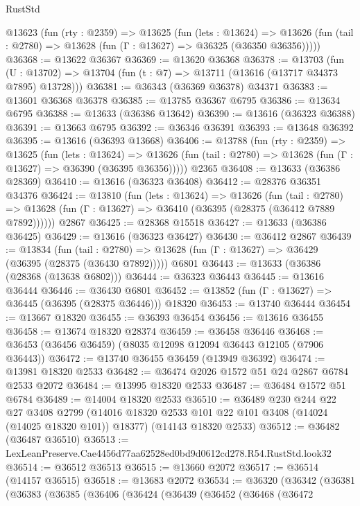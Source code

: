 \begin{lexlean}{RustStd}
\begin{coremodule}
  @13623
    (fun (rty : @2359) =>
    @13625
      (fun (lets : @13624) =>
      @13626 (fun (tail : @2780) => @13628 (fun (Γ : @13627) => @36325 (@36350 @36356)))))
@36368 := @13622 @36367
@36369 := @13620 @36368
@36378 := @13703
    (fun (U : @13702) => @13704 (fun (t : @7) => @13711 (@13616 (@13717 @34373 @7895) @13728)))
@36381 := @36343 (@36369 @36378) @34371
@36383 := @13601 @36368 @36378
@36385 := @13785 @36367 @6795
@36386 := @13634 @6795
@36388 := @13633 (@36386 @13642)
@36390 := @13616 (@36323 @36388)
@36391 := @13663 @6795
@36392 := @36346 @36391
@36393 := @13648 @36392
@36395 := @13616 (@36393 @13668)
@36406 := @13788
    (fun (rty : @2359) =>
    @13625
      (fun (lets : @13624) =>
      @13626 (fun (tail : @2780) => @13628 (fun (Γ : @13627) => @36390 (@36395 @36356)))))
    @2365
@36408 := @13633 (@36386 @28369)
@36410 := @13616 (@36323 @36408)
@36412 := @28376 @36351 @34376
@36424 := @13810
    (fun (lets : @13624) =>
    @13626
      (fun (tail : @2780) =>
      @13628 (fun (Γ : @13627) => @36410 (@36395 (@28375 (@36412 @7889 @7892))))))
    @2867
@36425 := @28368 @15518
@36427 := @13633 (@36386 @36425)
@36429 := @13616 (@36323 @36427)
@36430 := @36412 @2867
@36439 := @13834
    (fun (tail : @2780) => @13628 (fun (Γ : @13627) => @36429 (@36395 (@28375 (@36430 @7892)))))
    @6801
@36443 := @13633 (@36386 (@28368 (@13638 @6802)))
@36444 := @36323 @36443
@36445 := @13616 @36444
@36446 := @36430 @6801
@36452 := @13852 (fun (Γ : @13627) => @36445 (@36395 (@28375 @36446))) @18320
@36453 := @13740 @36444
@36454 := @13667 @18320
@36455 := @36393 @36454
@36456 := @13616 @36455
@36458 := @13674 @18320 @28374
@36459 := @36458 @36446
@36468 := @36453 (@36456 @36459) (@8035 @12098 @12094 @36443 @12105 (@7906 @36443))
@36472 := @13740 @36455 @36459 (@13949 @36392)
@36474 := @13981 @18320 @2533
@36482 := @36474 @2026 @1572 @51 @24 @2867 @6784 @2533 @2072
@36484 := @13995 @18320 @2533
@36487 := @36484 @1572 @51 @6784
@36489 := @14004 @18320 @2533
@36510 := @36489
    @230
    @244
    @22
    @27
    @3408
    @2799
    (@14016 @18320 @2533 @101 @22 @101 @3408 (@14024 (@14025 @18320 @101)) @18377)
    (@14143 @18320 @2533)
@36512 := @36482 (@36487 @36510)
@36513 := LexLeanPreserve.Cae4456d77aa62528ed0bd9d0612cd278.R54.RustStd.look32
@36514 := @36512 @36513
@36515 := @13660 @2072
@36517 := @36514 (@14157 @36515)
@36518 := @13683 @2072
@36534 := @36320
    (@36342
      (@36381
        (@36383
          (@36385
            (@36406
              (@36424
                (@36439
                  (@36452
                    (@36468
                      (@36472

\end{coremodule}
\end{lexlean}

